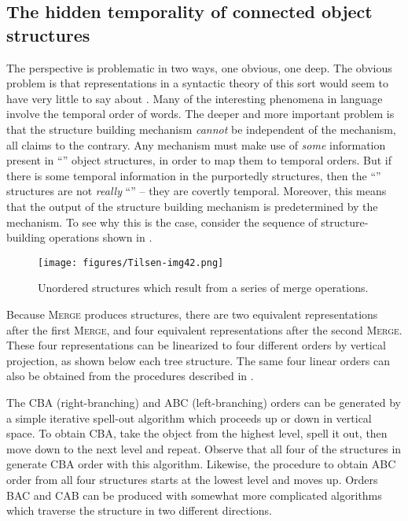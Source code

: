 \subsection{The hidden temporality of connected object structures}

The  perspective is problematic in two ways, one obvious, one deep. The obvious problem is that representations in a syntactic theory of this sort would seem to have very little to say about . Many of the interesting phenomena in language involve the temporal order of words. The deeper and more important problem is that the structure building mechanism \textit{cannot} be independent of the  mechanism, all claims to the contrary. Any  mechanism must make use of \textit{some} information present in “” object structures, in order to map them to temporal orders. But if there is some temporal information in the purportedly  structures, then the “” structures are not \textit{really} “” -- they are covertly temporal. Moreover, this means that the output of the structure building mechanism is predetermined by the  mechanism. To see why this is the  case, consider the sequence of structure-building operations shown in {}.

  
\begin{figure}
\texttt{[image: figures/Tilsen-img42.png]}
\caption{Unordered structures which result from a series of merge operations.}
\label{fig:3:14}
\end{figure}
 

  Because \textsc{Merge} produces  structures, there are two equivalent representations after the first \textsc{Merge}, and four equivalent representations after the second \textsc{Merge}. These four representations can be linearized to four different orders by vertical projection, as shown below each tree structure. The same four linear orders can also be obtained from the  procedures described in {}.

  The CBA (right-branching) and ABC (left-branching) orders can be generated by a simple iterative spell-out algorithm which proceeds up or down in vertical space. To obtain CBA, take the  object from the highest level, spell it out, then move down to the next level and repeat. Observe that all four of the structures in {} generate CBA order with this algorithm. Likewise, the procedure to obtain ABC order from all four structures starts at the lowest level and moves up. Orders BAC and CAB can be produced with somewhat more complicated algorithms which traverse the structure in two different directions.

